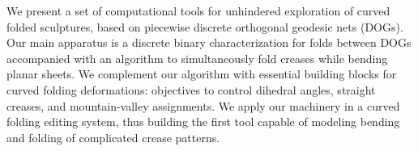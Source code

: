 We present a set of computational tools for unhindered exploration of curved folded sculptures, based on piecewise discrete orthogonal geodesic nets (DOGs). Our main apparatus is a discrete binary characterization for folds between DOGs accompanied with an algorithm to simultaneously fold creases while bending planar sheets. We complement our algorithm with essential building blocks for curved folding deformations: objectives to control dihedral angles, straight creases, and mountain-valley assignments. We apply our machinery in a curved folding editing system, thus building the first tool capable of modeling bending and folding of complicated crease patterns.


